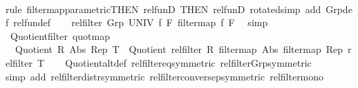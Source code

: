\begin{isabellebody}
\ \ \ \ \isamarkupfalse%
{\isacharparenleft}{\kern0pt}rule\ filtermap{\isacharunderscore}{\kern0pt}parametric{\isacharbrackleft}{\kern0pt}THEN\ rel{\isacharunderscore}{\kern0pt}funD{\isacharcomma}{\kern0pt}\ THEN\ rel{\isacharunderscore}{\kern0pt}funD{\isacharcomma}{\kern0pt}\ rotated{\isacharbrackright}{\kern0pt}{\isacharparenright}{\kern0pt}{\isacharparenleft}{\kern0pt}simp\ add{\isacharcolon}{\kern0pt}\ Grp{\isacharunderscore}{\kern0pt}def\ rel{\isacharunderscore}{\kern0pt}fun{\isacharunderscore}{\kern0pt}def{\isacharparenright}{\kern0pt}\isanewline
\ \ \isamarkupfalse%
\ {\isachardoublequoteopen}rel{\isacharunderscore}{\kern0pt}filter\ {\isacharparenleft}{\kern0pt}Grp\ UNIV\ f{\isacharparenright}{\kern0pt}\ F\ {\isacharparenleft}{\kern0pt}filtermap\ f\ F{\isacharparenright}{\kern0pt}{\isachardoublequoteclose}\ \isamarkupfalse%
\ simp\isanewline
{}\isamarkupfalse%
%
\endisatagproof
{\isafoldproof}%
%
\isadelimproof
\isanewline
%
\endisadelimproof
\isanewline
{}\isamarkupfalse%
\ Quotient{\isacharunderscore}{\kern0pt}filter\ {\isacharbrackleft}{\kern0pt}quot{\isacharunderscore}{\kern0pt}map{\isacharbrackright}{\kern0pt}{\isacharcolon}{\kern0pt}\isanewline
\ \ {\isachardoublequoteopen}Quotient\ R\ Abs\ Rep\ T\ {\isasymLongrightarrow}\ Quotient\ {\isacharparenleft}{\kern0pt}rel{\isacharunderscore}{\kern0pt}filter\ R{\isacharparenright}{\kern0pt}\ {\isacharparenleft}{\kern0pt}filtermap\ Abs{\isacharparenright}{\kern0pt}\ {\isacharparenleft}{\kern0pt}filtermap\ Rep{\isacharparenright}{\kern0pt}\ {\isacharparenleft}{\kern0pt}rel{\isacharunderscore}{\kern0pt}filter\ T{\isacharparenright}{\kern0pt}{\isachardoublequoteclose}\isanewline
%
\isadelimproof
\ \ %
\endisadelimproof
%
\isatagproof
{}\isamarkupfalse%
\ Quotient{\isacharunderscore}{\kern0pt}alt{\isacharunderscore}{\kern0pt}def{}\ rel{\isacharunderscore}{\kern0pt}filter{\isacharunderscore}{\kern0pt}eq{\isacharbrackleft}{\kern0pt}symmetric{\isacharbrackright}{\kern0pt}\ rel{\isacharunderscore}{\kern0pt}filter{\isacharunderscore}{\kern0pt}Grp{\isacharbrackleft}{\kern0pt}symmetric{\isacharbrackright}{\kern0pt}\isanewline
\ \ \isamarkupfalse%
{\isacharparenleft}{\kern0pt}simp\ add{\isacharcolon}{\kern0pt}\ rel{\isacharunderscore}{\kern0pt}filter{\isacharunderscore}{\kern0pt}distr{\isacharbrackleft}{\kern0pt}symmetric{\isacharbrackright}{\kern0pt}\ rel{\isacharunderscore}{\kern0pt}filter{\isacharunderscore}{\kern0pt}conversep{\isacharbrackleft}{\kern0pt}symmetric{\isacharbrackright}{\kern0pt}\ rel{\isacharunderscore}{\kern0pt}filter{\isacharunderscore}{\kern0pt}mono{\isacharparenright}{\kern0pt}%

\end{isabellebody}

